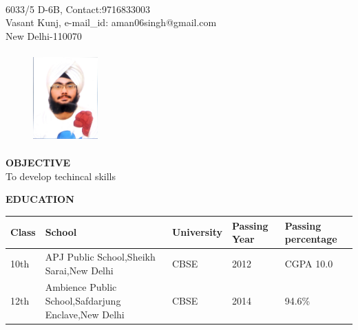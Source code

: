 \documentclass{article}
\begin{document}
\\
\vspace{0.5in}


\begin{flushleft}
6033/5 D-6B, \hfill{Contact:9716833003}\\
Vasant Kunj, \hfill{e-mail\_id: aman06singh@gmail.com}\\
New Delhi-110070\\
\end{flushleft}



\begin{figure}[h]
\begin{flushright}	
\includegraphics[width=2.5cm, height=3.5cm]{pic.jpg}	
\end{flushright}
\end{figure}



\begin{flushleft}
\textbf{OBJECTIVE }\\
\hspace{1in}
To develop techincal skills
\end{flushleft}



\begin{flushleft}
\vspace{0.3in}
\textbf{EDUCATION }
\begin{center}
\begin{tabular}{| L{2cm} | C{4cm} | C{2cm} | C{2cm} | R{2cm}| }
\hline
Class & School & University & Passing Year & Passing percentage\\ 
\hline
10th & APJ Public School,Sheikh Sarai,New Delhi & CBSE & 2012 & CGPA 10.0\\
\hline
12th & Ambience Public School,Safdarjung Enclave,New Delhi & CBSE & 2014 & 94.6\% \\
\hline
\end{tabular}
\end{center}
\end{flushleft}
\end{document}

